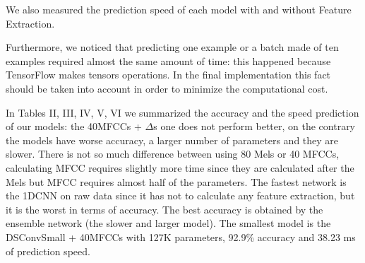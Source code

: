 \documentclass[conference]{IEEEtran}
\begin{document}
We also measured the prediction speed of each model with and without Feature Extraction. 

Furthermore, we noticed that predicting one example or a batch made of ten examples required almost the same amount of time: this happened because TensorFlow makes tensors operations. In the final implementation this fact should be taken into account in order to minimize the computational cost.

In Tables II, III, IV, V, VI we summarized the accuracy and the speed prediction of our models: the 40MFCCs + $\Delta$s one does not perform better, on the contrary the models have worse accuracy, a larger number of parameters and they are slower.
There is not so much difference between using 80 Mels or 40 MFCCs, calculating MFCC requires slightly more time since they are calculated after the Mels but MFCC requires almost half of the parameters.
The fastest network is the 1DCNN on raw data since it has not to calculate any feature extraction, but it is the worst in terms of accuracy.
The best accuracy is obtained by the ensemble network (the slower and larger model).
The smallest model is the DSConvSmall + 40MFCCs with 127K parameters, 92.9\% accuracy and 38.23 ms of prediction speed.
\begin{center}
\begin{table}[]
\begin{center}
\caption{1DCNN performances on 10 and 21-commands datasets.}
\end{center}
\end{table}
\end{center}
\end{document}
